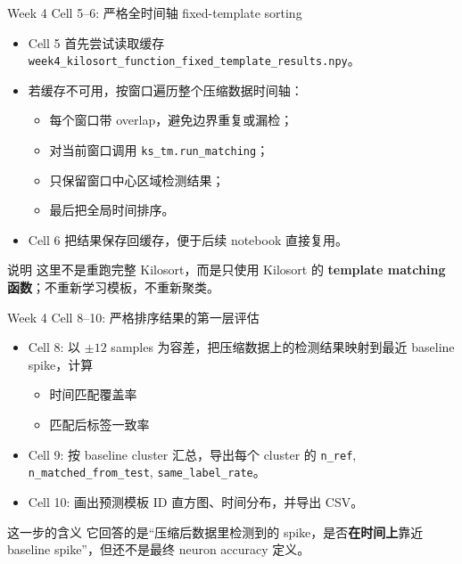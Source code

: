 \documentclass[aspectratio=169,11pt]{beamer}
\begin{document}
\begin{frame}{Week 4 Cell 5--6: 严格全时间轴 fixed-template sorting}
  \begin{itemize}
    \item Cell 5 首先尝试读取缓存 \texttt{week4\_kilosort\_function\_fixed\_template\_results.npy}。
    \item 若缓存不可用，按窗口遍历整个压缩数据时间轴：
    \begin{itemize}
      \item 每个窗口带 overlap，避免边界重复或漏检；
      \item 对当前窗口调用 \texttt{ks\_tm.run\_matching}；
      \item 只保留窗口中心区域检测结果；
      \item 最后把全局时间排序。
    \end{itemize}
    \item Cell 6 把结果保存回缓存，便于后续 notebook 直接复用。
  \end{itemize}
  \begin{block}{说明}
    这里不是重跑完整 Kilosort，而是只使用 Kilosort 的 \textbf{template matching 函数}；不重新学习模板，不重新聚类。
  \end{block}
\end{frame}

\begin{frame}{Week 4 Cell 8--10: 严格排序结果的第一层评估}
  \begin{itemize}
    \item Cell 8: 以 $\pm 12$ samples 为容差，把压缩数据上的检测结果映射到最近 baseline spike，计算
    \begin{itemize}
      \item 时间匹配覆盖率
      \item 匹配后标签一致率
    \end{itemize}
    \item Cell 9: 按 baseline cluster 汇总，导出每个 cluster 的
    \texttt{n\_ref}, \texttt{n\_matched\_from\_test}, \texttt{same\_label\_rate}。
    \item Cell 10: 画出预测模板 ID 直方图、时间分布，并导出 CSV。
  \end{itemize}
  \begin{block}{这一步的含义}
    它回答的是“压缩后数据里检测到的 spike，是否\textbf{在时间上}靠近 baseline spike”，但还不是最终 neuron accuracy 定义。
  \end{block}
\end{frame}
\end{document}

